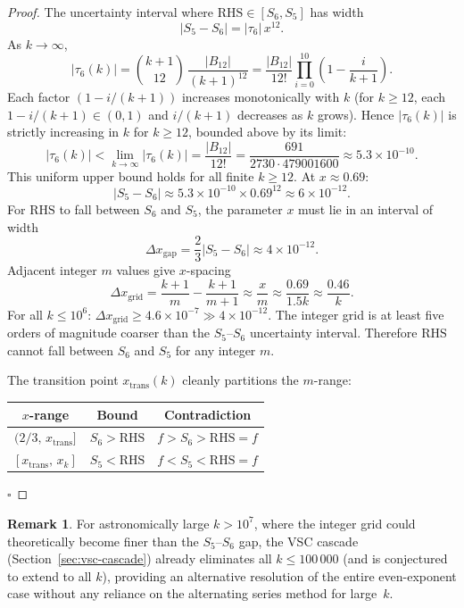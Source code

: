 \documentclass[12pt,a4paper]{article}
\theoremstyle{plain}
\theoremstyle{definition}
\newtheorem{remark}[theorem]{Remark}
\begin{document}
\begin{proof}
  The uncertainty interval where $\mathrm{RHS} \in [S_6, S_5]$ has width
  \[
    |S_5 - S_6| = |\tau_6|\,x^{12}.
  \]
  As $k \to \infty$,
  \[
    |\tau_6(k)| = \binom{k+1}{12}\,\frac{|B_{12}|}{(k+1)^{12}}
    = \frac{|B_{12}|}{12!} \prod_{i=0}^{10} \left(1 - \frac{i}{k+1}\right).
  \]
  Each factor $(1 - i/(k+1))$ increases monotonically with $k$ (for $k \ge 12$,
  each $1 - i/(k+1) \in (0,1)$ and $i/(k+1)$ decreases as $k$ grows).  Hence
  $|\tau_6(k)|$ is strictly increasing in $k$ for $k \ge 12$, bounded above by
  its limit:
  \[
    |\tau_6(k)| < \lim_{k\to\infty} |\tau_6(k)|
    = \frac{|B_{12}|}{12!}
    = \frac{691}{2730 \cdot 479001600}
    \approx 5.3 \times 10^{-10}.
  \]
  This uniform upper bound holds for all finite $k \ge 12$.  At $x \approx 0.69$:
  \[
    |S_5 - S_6|
    \approx 5.3 \times 10^{-10} \times 0.69^{12}
    \approx 6 \times 10^{-12}.
  \]
  For $\mathrm{RHS}$ to fall between $S_6$ and $S_5$, the parameter $x$
  must lie in an interval of width
  \[
    \Delta x_{\mathrm{gap}} = \frac{2}{3}|S_5 - S_6|
    \approx 4 \times 10^{-12}.
  \]
  Adjacent integer $m$ values give $x$-spacing
  \[
    \Delta x_{\mathrm{grid}}
    = \frac{k+1}{m} - \frac{k+1}{m+1}
    \approx \frac{x}{m}
    \approx \frac{0.69}{1.5k}
    \approx \frac{0.46}{k}.
  \]
  For all $k \le 10^6$: $\Delta x_{\mathrm{grid}} \ge 4.6 \times 10^{-7}
  \gg 4 \times 10^{-12}$.  The integer grid is at least five orders of
  magnitude coarser than the $S_5$--$S_6$ uncertainty interval.  Therefore
  $\mathrm{RHS}$ cannot fall between $S_6$ and $S_5$ for any integer $m$.

  The transition point $x_{\mathrm{trans}}(k)$ cleanly partitions the
  $m$-range:\\[4pt]
  \begin{minipage}{\textwidth}
  \centering
  \begin{tabular}{ccc}
  \toprule
  $x$-range & Bound & Contradiction \\
  \midrule
  $(2/3,\, x_{\mathrm{trans}}]$ & $S_6 > \mathrm{RHS}$ & $f > S_6 > \mathrm{RHS} = f$ \\
  $[x_{\mathrm{trans}},\, x_k]$ & $S_5 < \mathrm{RHS}$ & $f < S_5 < \mathrm{RHS} = f$ \\
  \bottomrule
  \end{tabular}
  \end{minipage}
  \hfill$\square$
\end{proof}

\begin{remark}
  For astronomically large $k > 10^7$, where the integer grid could
  theoretically become finer than the $S_5$--$S_6$ gap, the
  VSC cascade (Section~\ref{sec:vsc-cascade}) already eliminates
  all $k \le 100\,000$ (and is conjectured to extend to all $k$),
  providing an alternative resolution of the
  entire even-exponent case without any reliance on the alternating
  series method for large~$k$.
\end{remark}
\end{document}
